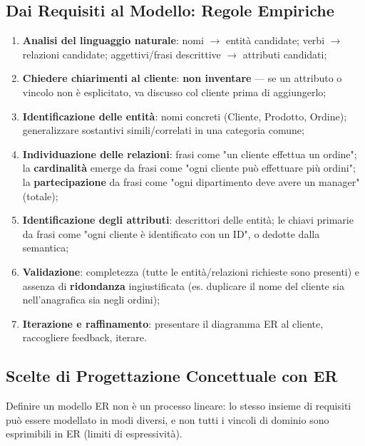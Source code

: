\documentclass[12pt, a4paper]{article}
\begin{document}
\subsection{Dai Requisiti al Modello: Regole Empiriche}
\begin{enumerate}
    \item \textbf{Analisi del linguaggio naturale}: nomi $\to$ entità candidate; verbi $\to$ relazioni candidate; aggettivi/frasi descrittive $\to$ attributi candidati;
    \item \textbf{Chiedere chiarimenti al cliente}: \textbf{non inventare} — se un attributo o vincolo non è esplicitato, va discusso col cliente prima di aggiungerlo;
    \item \textbf{Identificazione delle entità}: nomi concreti (Cliente, Prodotto, Ordine); generalizzare sostantivi simili/correlati in una categoria comune;
    \item \textbf{Individuazione delle relazioni}: frasi come "un cliente effettua un ordine"; la \textbf{cardinalità} emerge da frasi come "ogni cliente può effettuare più ordini"; la \textbf{partecipazione} da frasi come "ogni dipartimento deve avere un manager" (totale);
    \item \textbf{Identificazione degli attributi}: descrittori delle entità; le chiavi primarie da frasi come "ogni cliente è identificato con un ID", o dedotte dalla semantica;
    \item \textbf{Validazione}: completezza (tutte le entità/relazioni richieste sono presenti) e assenza di \textbf{ridondanza} ingiustificata (es. duplicare il nome del cliente sia nell'anagrafica sia negli ordini);
    \item \textbf{Iterazione e raffinamento}: presentare il diagramma ER al cliente, raccogliere feedback, iterare.
\end{enumerate}

\subsection{Scelte di Progettazione Concettuale con ER}

Definire un modello ER non è un processo lineare: lo stesso insieme di requisiti può essere modellato in modi diversi, e non tutti i vincoli di dominio sono esprimibili in ER (limiti di espressività).
\end{document}

